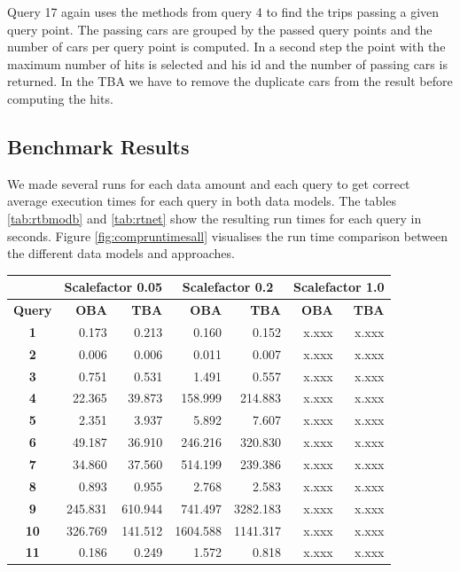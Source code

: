 \documentclass[a4paper]{article}
\begin{document}
{Query 17 again uses the methods from query 4 to find the trips passing a given query point. The passing cars are grouped by the passed query points and the number of cars per query point is computed. In a second step the point with the maximum number of hits is selected and his id and the number of passing cars is returned. In the TBA we have to remove the duplicate cars from the result before computing the hits.
\subsection{Benchmark Results}
\label{sec:results}
We made several runs for each data amount and each query to get correct average execution times for each query in both data models. The tables \ref{tab:rtbmodb} and \ref{tab:rtnet} show the resulting run times for each query in seconds. Figure \ref{fig:compruntimesall} visualises the run time comparison between the different data models and approaches.
\begin{table}
\begin{scriptsize}
\begin{center}
\begin{tabular}{|c|r|r|r|r|r|r|}
\hline
&\multicolumn{2}{c|}{\textbf{Scalefactor 0.05}}&\multicolumn{2}{c|}{\textbf{Scalefactor 0.2}}&\multicolumn{2}{c|}{\textbf{Scalefactor 1.0}}\\
\hline
\textbf{Query}&\textbf{OBA}&\textbf{TBA}&\textbf{OBA}&\textbf{TBA}&\textbf{OBA}&\textbf{TBA}\\
\hline
\textbf{1}&0.173&0.213&0.160&0.152&x.xxx&x.xxx\\
\hline
\textbf{2}&0.006&0.006&0.011&0.007&x.xxx&x.xxx\\
\hline
\textbf{3}&0.751&0.531&1.491&0.557&x.xxx&x.xxx\\
\hline
\textbf{4}&22.365&39.873&158.999&214.883&x.xxx&x.xxx\\
\hline
\textbf{5}&2.351&3.937&5.892&7.607&x.xxx&x.xxx\\
\hline
\textbf{6}&49.187&36.910&246.216&320.830&x.xxx&x.xxx\\
\hline
\textbf{7}&34.860&37.560&514.199&239.386&x.xxx&x.xxx\\
\hline
\textbf{8}&0.893&0.955&2.768&2.583&x.xxx&x.xxx\\
\hline
\textbf{9}&245.831&610.944&741.497&3282.183&x.xxx&x.xxx\\
\hline
\textbf{10}&326.769&141.512&1604.588&1141.317&x.xxx&x.xxx\\
\hline
\textbf{11}&0.186&0.249&1.572&0.818&x.xxx&x.xxx\\

\end{tabular}
\end{center}
\end{scriptsize}
\end{table}}
\end{document}
